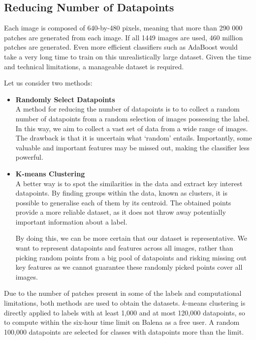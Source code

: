\subsection{Reducing Number of Datapoints} \label{ssec:datapoint-reduction}
Each image is composed of 640-by-480 pixels, meaning that more than 290 000 patches are generated from each image. If all 1449 images are used, 460 million patches are generated. Even more efficient classifiers such as AdaBoost would take a very long time to train on this unrealistically large dataset. Given the time and technical limitations, a manageable dataset is required. 

Let us consider two methods:

\begin{itemize}
  \item \textbf{Randomly Select Datapoints} \\
A method for reducing the number of datapoints is to to collect a random number of datapoints from a random selection of images possessing the label. In this way, we aim to collect a vast set of data from a wide range of images. The drawback is that it is uncertain what `random' entails. Importantly, some valuable and important features may be missed out, making the classifier less powerful. \\
  
  \item \textbf{K-means Clustering} \\
A better way is to spot the similarities in the data and extract key interest datapoints. By finding groups within the data, known as clusters, it is possible to generalise each of them by its centroid. The obtained points provide a more reliable dataset, as it does not throw away potentially important information about a label.

By doing this, we can be more certain that our dataset is representative. We want to represent datapoints and features across all images, rather than picking random points from a big pool of datapoints and risking missing out key features as we cannot guarantee these randomly picked points cover all images.
\end{itemize}

Due to the number of patches present in some of the labels and computational limitations, both methods are used to obtain the datasets. $k$-means clustering is directly applied to labels with at least 1,000 and at most 120,000 datapoints, so to compute within the six-hour time limit on Balena as a free user. A random 100,000 datapoints are selected for classes with datapoints more than the limit. 

